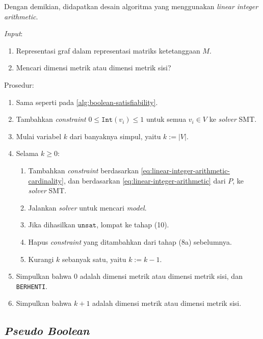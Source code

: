 \documentclass[10pt,twocolumn]{article}
\newcommand{\foreign}[1]{\foreignlanguage{english}{\textit{#1}}}
\def\intmap{\mathtt{Int}}
\def\unsat{\mathtt{unsat}}
\begin{document}
Dengan demikian, didapatkan desain algoritma yang menggunakan \foreign{linear integer arithmetic}.

\begin{algorithm}[H]
	\foreign{Input}:
	\begin{enumerate}
		\item Representasi graf dalam representasi matriks ketetanggaan \(M\).
		\item Mencari dimensi metrik atau dimensi metrik sisi?
	\end{enumerate}
	Prosedur:
	\begin{enumerate}
		\item[1--5.] Sama seperti pada \autoref{alg:boolean-satisfiability}.
		\setcounter{enumi}{5}
		\item Tambahkan \foreign{constraint} \(0 \leq \intmap(v_i) \leq 1\) untuk semua \(v_i \in V\) ke \foreign{solver} SMT.
		\item Mulai variabel \(k\) dari banyaknya simpul, yaitu \(k := |V|\).
		\item Selama \(k \geq 0\):
			\begin{enumerate}
					\item Tambahkan \foreign{constraint} berdasarkan \autoref{eq:linear-integer-arithmetic-cardinality}, dan berdasarkan \autoref{eq:linear-integer-arithmetic} dari \(P\), ke \foreign{solver} SMT.
					\item Jalankan \foreign{solver} untuk mencari \foreign{model}.
					\item Jika dihasilkan \(\unsat\), lompat ke tahap (10).
					\item Hapus \foreign{constraint} yang ditambahkan dari tahap (8a) sebelumnya.
					\item Kurangi \(k\) sebanyak satu, yaitu \(k := k - 1\).
			\end{enumerate}
		\item Simpulkan bahwa 0 adalah dimensi metrik atau dimensi metrik sisi, dan \texttt{BERHENTI}.
		\item Simpulkan bahwa \(k + 1\) adalah dimensi metrik atau dimensi metrik sisi.
	\end{enumerate}
	\caption{\foreign{Linear Integer Arithmetic}}
	\label{alg:linear-integer-arithmetic}
\end{algorithm}

\subsection{\foreign{Pseudo Boolean}}
\end{document}

